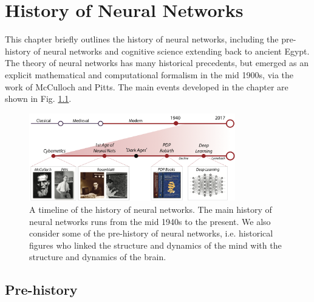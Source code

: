 \chapter{History of Neural Networks}\label{ch_history}


This chapter briefly outlines the history of neural networks, including the pre-history of neural networks and cognitive science extending back to ancient Egypt. The theory of neural networks has many historical precedents, but emerged as an explicit mathematical and computational formalism in the mid 1900s, via the work of McCulloch and Pitts. The main events developed in the chapter are shown in Fig. \ref{timelineHistory}. 

\begin{figure}[h]
\centering
\includegraphics[width=0.8\textwidth]{images/historyTimeline.png}
\caption[Pamela Payne and Jeff Yoshimi.]{A timeline of the history of neural networks. The main history of neural networks runs from the mid 1940s to the present. We  also consider some of the pre-history of neural networks,  i.e. historical figures who linked the structure and dynamics of the mind with the structure and dynamics of the brain.}
\label{timelineHistory}
\end{figure}

\section{Pre-history}

